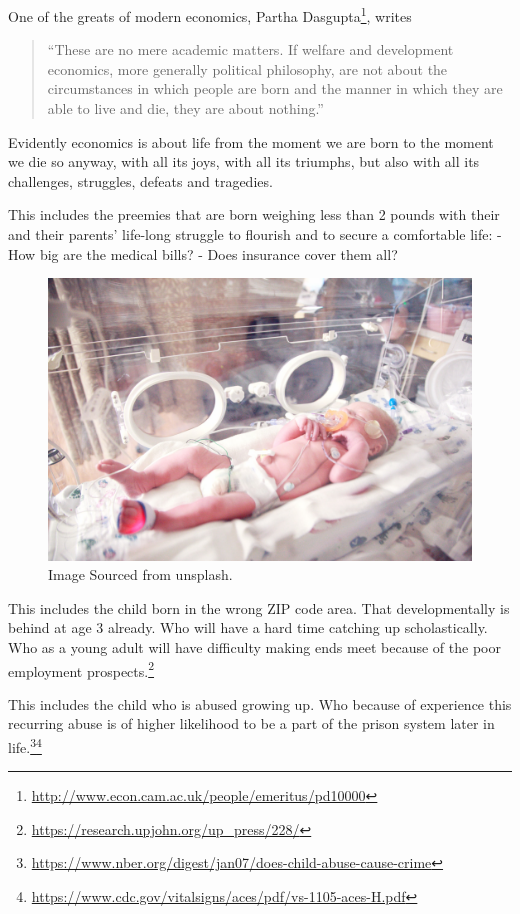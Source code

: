 \documentclass[
]{book}
\begin{document}
One of the greats of modern economics, Partha Dasgupta\footnote{\url{http://www.econ.cam.ac.uk/people/emeritus/pd10000}}, writes

\begin{quote}
``These are no mere academic matters. If welfare and development economics, more generally political philosophy, are not about the circumstances in which people are born and the manner in which they are able to live and die, they are about nothing.''
\end{quote}

Evidently economics is about life from the moment we are born to the moment we die so anyway, with all its joys, with all its triumphs, but also with all its challenges, struggles, defeats and tragedies.

This includes the preemies that are born weighing less than 2 pounds with their and their parents' life-long struggle to flourish and to secure a comfortable life:
- How big are the medical bills?
- Does insurance cover them all?

\begin{figure}

{\centering \includegraphics[width=0.5\linewidth]{img/ch0/fig4} 

}

\caption{Image Sourced from unsplash.}\label{fig:fig004}
\end{figure}

This includes the child born in the wrong ZIP code area. That developmentally is behind at age 3 already. Who will have a hard time catching up scholastically. Who as a young adult will have difficulty making ends meet because of the poor employment prospects.\footnote{\url{https://research.upjohn.org/up_press/228/}}

This includes the child who is abused growing up. Who because of experience this recurring abuse is of higher likelihood to be a part of the prison system later in life.\footnote{\url{https://www.nber.org/digest/jan07/does-child-abuse-cause-crime}}\footnote{\url{https://www.cdc.gov/vitalsigns/aces/pdf/vs-1105-aces-H.pdf}}
\end{document}

